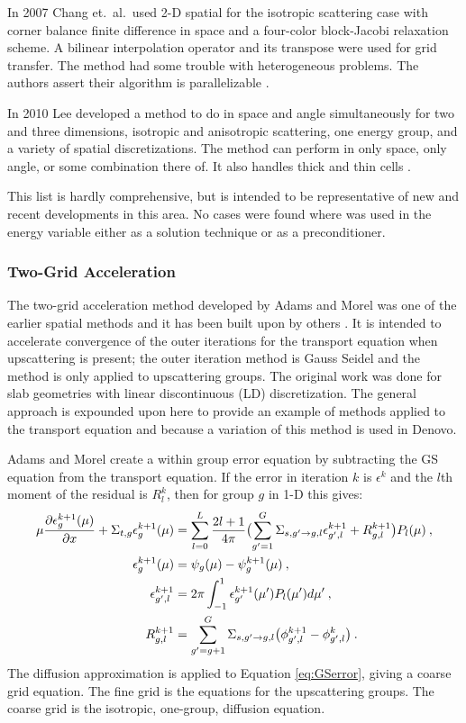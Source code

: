 In 2007 Chang et.\ al.\ used 2-D spatial \mg for the isotropic scattering case with corner balance finite difference in space and a four-color block-Jacobi relaxation scheme. A bilinear interpolation operator and its transpose were used for grid transfer. The method had some trouble with heterogeneous problems. The authors assert their algorithm is parallelizable \cite{Chang2007}.

In 2010 Lee developed a method to do \mg in space and angle simultaneously for two and three dimensions, isotropic and anisotropic scattering, one energy group, and a variety of spatial discretizations. The method can perform \mg in only space, only angle, or some combination there of. It also handles thick and thin cells \cite{Lee2010}.

This list is hardly comprehensive, but is intended to be representative of new and recent developments in this area. No cases were found where \mg was used in the energy variable either as a solution technique or as a preconditioner. 

\subsubsection{Two-Grid Acceleration}
The two-grid acceleration method developed by Adams and Morel was one of the earlier spatial \mg methods and it has been built upon by others \cite{Adams1993}. It is intended to accelerate convergence of the outer iterations for the transport equation when upscattering is present; the outer iteration method is Gauss Seidel and the method is only applied to upscattering groups. The original work was done for slab geometries with linear discontinuous (LD) discretization. The general approach is expounded upon here to provide an example of \mg methods applied to the transport equation and because a variation of this method is used in Denovo. 

Adams and Morel create a within group error equation by subtracting the GS equation from the transport equation. If the error in iteration $k$ is $\epsilon^k$ and the $l$th moment of the residual is $R_l^k$, then for group $g$ in 1-D this gives:
%
\begin{align}
   \mu \frac{\partial \epsilon_{g}^{k+1}(\mu)}{\partial x} + \Sigma_{t,g} \epsilon_{g}^{k+1}(\mu) &= \sum_{l=0}^{L}\frac{2l+1}{4\pi} \bigl( \sum_{g'=1}^{G}\Sigma_{s,g' \to g, l} \epsilon_{g',l}^{k+1} 
   +  R_{g,l}^{k+1}\bigr) P_{l}(\mu) \:,\label{eq:GSerror} \\
  \epsilon_{g}^{k+1}(\mu) &= \psi_{g}(\mu) - \psi_{g}^{k+1}(\mu) \:, \\
  \epsilon_{g',l}^{k+1} &= 2\pi \int_{-1}^{1}\epsilon_{g'}^{k+1}(\mu') P_{l}(\mu') d\mu' \:, \\ 
  R_{g,l}^{k+1} &=  \sum_{g'=g+1}^{G}\Sigma_{s,g' \to g, l} \bigl( \phi_{g',l}^{k+1} - \phi_{g',l}^{k} \bigr) \:.
\end{align}
%
The diffusion approximation is applied to Equation \eqref{eq:GSerror}, giving a coarse grid equation. The fine grid is the \Sn equations for the upscattering groups. The coarse grid is the isotropic, one-group, diffusion equation. 

